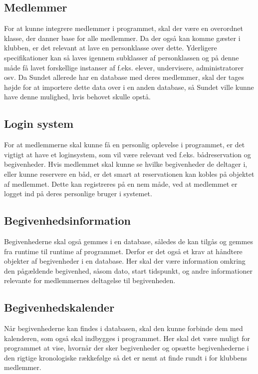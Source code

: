 \subsection{Medlemmer}

For at kunne integrere medlemmer i programmet, skal der være en overordnet klasse, der danner base for alle
medlemmer. 
Da der også kan komme gæster i klubben, er det relevant at lave en personklasse over dette.
Yderligere specifikationer kan så laves igennem subklasser af personklassen og på denne måde få lavet forskellige
instanser af f.eks. elever, undervisere, administratorer osv. 
Da Sundet allerede har en database med deres medlemmer, skal der tages højde for at importere dette data over i en anden database, så Sundet ville kunne have denne mulighed, hvis behovet skulle opstå.

\subsection{Login system}

For at medlemmerne skal kunne få en personlig oplevelse i programmet, er det vigtigt at have et loginsystem, som vil
være relevant ved f.eks. bådreservation og begivenheder. Hvis medlemmet skal kunne se hvilke begivenheder de deltager i, eller kunne reservere en båd, er det smart at reservationen kan kobles på objektet af medlemmet. 
Dette kan registreres på en nem måde, ved at medlemmet er logget ind på deres personlige bruger i systemet.


\subsection{Begivenhedsinformation}

Begivenhederne skal også gemmes i en database, således de kan tilgås og gemmes fra runtime til runtime af programmet. 
Derfor er det også et krav at håndtere objekter af begivenheder i en database. 
Her skal der være information omkring den pågældende begivenhed, såsom dato, start tidspunkt, og andre informationer relevante for medlemmernes deltagelse til
begivenheden.

\subsection{Begivenhedskalender}

Når begivenhederne kan findes i databasen, skal den kunne forbinde dem med kalenderen, som også skal indbygges i
programmet. Her skal det være muligt for programmet at vise, hvornår der sker begivenheder og opsætte begivenhederne i den rigtige kronologiske rækkefølge så det er nemt at finde rundt i for klubbens medlemmer.

